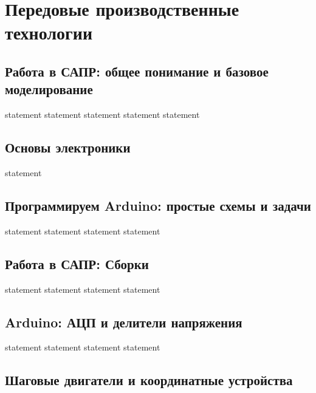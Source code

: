 \chapter{Передовые производственные технологии}

\section{Работа в САПР: общее понимание и базовое моделирование}

{statement}
{statement}
{statement}
{statement}
{statement}

\section{Основы электроники}

{statement}

\section{Программируем Arduino: простые схемы и задачи}

{statement}
{statement}
{statement}
{statement}

\section{Работа в САПР: Сборки}

{statement}
{statement}
{statement}
{statement}

\section{Arduino: АЦП и делители напряжения}

{statement}
{statement}
{statement}
{statement}

\section{Шаговые двигатели и координатные устройства}

